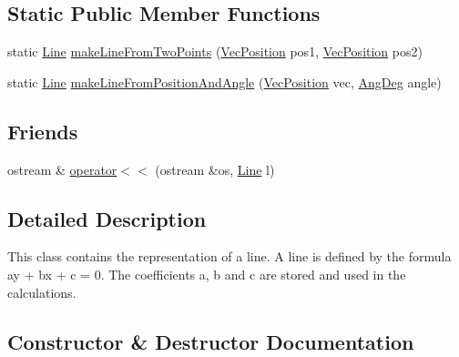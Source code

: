 \subsection*{Static Public Member Functions}
\begin{DoxyCompactItemize}
\item 
static \hyperlink{classLine}{Line} \hyperlink{classLine_adab514de90fd2218c8b2b2aab0bdcb33}{make\+Line\+From\+Two\+Points} (\hyperlink{classVecPosition}{Vec\+Position} pos1, \hyperlink{classVecPosition}{Vec\+Position} pos2)
\item 
static \hyperlink{classLine}{Line} \hyperlink{classLine_ad5f134dc3556b0f18b53bc2b3fb7e6a6}{make\+Line\+From\+Position\+And\+Angle} (\hyperlink{classVecPosition}{Vec\+Position} vec, \hyperlink{Geometry_8h_a6bfe02ae9bb185092902092561ab2865}{Ang\+Deg} angle)
\end{DoxyCompactItemize}
\subsection*{Friends}
\begin{DoxyCompactItemize}
\item 
ostream \& \hyperlink{classLine_af288570ccd047cae99dc45e4743d99ae}{operator$<$$<$} (ostream \&os, \hyperlink{classLine}{Line} l)
\end{DoxyCompactItemize}


\subsection{Detailed Description}
This class contains the representation of a line. A line is defined by the formula ay + bx + c = 0. The coefficients a, b and c are stored and used in the calculations. 

\subsection{Constructor \& Destructor Documentation}
